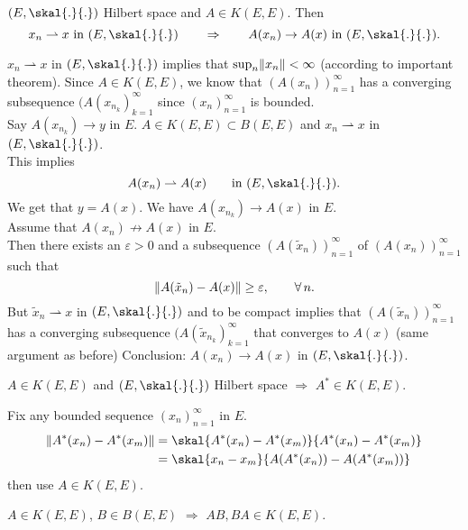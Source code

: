 \begin{proposition}
	$(E,\skal{.}{.})$ Hilbert space and $A \in K(E,E)$. Then \[
		x_n \rightharpoonup x \text{ in } (E, \skal{.}{.}) \qquad \Rightarrow \qquad A(x_n) \to A(x) \text{ in }(E,\skal{.}{.}).
	\]
\end{proposition}
\begin{beweis}
	$x_n \rightharpoonup x$ in $(E,\skal{.}{.})$ implies that $\sup_n \norm{x_n}< \infty$ (according to important theorem). Since $A \in K(E,E)$, we know that $(A(x_n))_{n=1}^{\infty}$ has a converging subsequence $(A(x _{n_k})_{k=1}^{\infty}$ since $(x_n)_{n=1}^{\infty}$ is bounded. \\
	Say $A(x _{n_k}) \to y$ in $E$. $A \in K(E,E) \subset B(E,E)$ and $x_n \rightharpoonup x$ in $(E, \skal{.}{.})$. \\
	This implies
	\[
		A(x_n) \rightharpoonup A(x) \qquad \text{in }(E,\skal{.}{.}).
	\]
	We get that $y = A(x)$. We have $A(x _{n_k}) \to A(x)$ in $E$. \\
	Assume that $A(x_n) \not \to  A(x)$ in $E$. \\
	Then there exists an $\varepsilon >0$ and a subsequence $(A(\tilde x_n))_{n=1}^{\infty}$ of $(A(x_n))_{n=1}^{\infty}$ such that
	\[
		\norm{A( \tilde x_n) - A(x)} \geq \varepsilon, \qquad \forall\,  n.
	\]
	But $\tilde x_n \rightharpoonup x$ in $(E,\skal{.}{.})$ and to be compact implies that $(A(\tilde x_n))_{n=1}^{\infty}$ has a converging subsequence $(A( \tilde x _{n_k})_{k=1}^{\infty}$ that converges to $A(x)$ (same argument as before)
	Conclusion: $A(x_n) \to A(x)$ in $(E, \skal{.}{.})$.
\end{beweis}

\begin{proposition}
	$A \in K(E,E)$ and $(E, \skal{.}{.})$ Hilbert space \qquad $\Rightarrow $ $A^* \in K(E,E)$.
\end{proposition}
\begin{beweis}
	Fix any bounded sequence $(x_n)_{n=1}^{\infty}$ in $E$. 
	\begin{align*}
		\norm{A^*(x_n)-A^*(x_m)} &= \skal{A^*(x_n)-A^*(x_m)}{A^*(x_n)-A^*(x_m)} \\
		&= \skal{x_n-x_m}{A(A^*(x_n))-A(A^*(x_m))} 
	\end{align*}
	then use $A \in K(E,E)$.
\end{beweis}

\begin{proposition}
	$A \in K(E,E)$, $B \in B(E,E)$ \qquad $\Rightarrow $ $AB,BA \in K(E,E)$.
\end{proposition}

